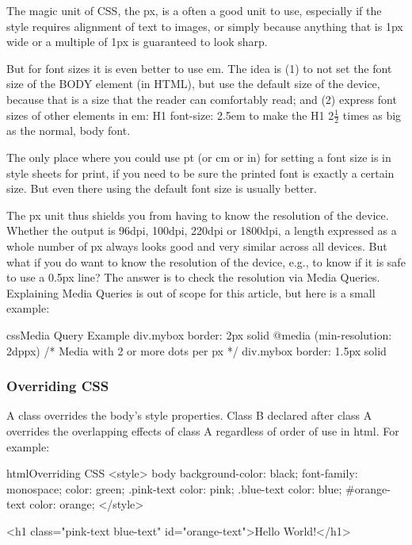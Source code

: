 The magic unit of CSS, the px, is a often a good unit to use, especially if the style requires alignment of text to images, or simply because anything that is 1px wide or a multiple of 1px is guaranteed to look sharp.

But for font sizes it is even better to use em. The idea is (1) to not set the font size of the BODY element (in HTML), but use the default size of the device, because that is a size that the reader can comfortably read; and (2) express font sizes of other elements in em: H1 {font-size: 2.5em} to make the H1 2$\frac{1}{2}$ times as big as the normal, body font.

The only place where you could use pt (or cm or in) for setting a font size is in style sheets for print, if you need to be sure the printed font is exactly a certain size. But even there using the default font size is usually better.

\begin{tcolorbox}

The px unit thus shields you from having to know the resolution of the device. Whether the output is 96dpi, 100dpi, 220dpi or 1800dpi, a length expressed as a whole number of px always looks good and very similar across all devices. But what if you do want to know the resolution of the device, e.g., to know if it is safe to use a 0.5px line? The answer is to check the resolution via Media Queries. Explaining Media Queries is out of scope for this article, but here is a small example:
\end{tcolorbox}

\begin{codeBlock}{css}{Media Query Example}
div.mybox { border: 2px solid }
@media (min-resolution: 2dppx) {
  /* Media with 2 or more dots per px */
  div.mybox { border: 1.5px solid }
}
\end{codeBlock}

\subsubsection{Overriding CSS}
A class overrides the body's style properties. Class B declared after class A overrides the overlapping effects of class A regardless of order of use in html. For example:

\begin{codeBlock}{html}{Overriding CSS}
<style>
  body {
    background-color: black;
    font-family: monospace;
    color: green;
  }
  .pink-text {
    color: pink;
  }
  .blue-text {
    color: blue;
  }
  #orange-text {
    color: orange;
  }
</style>

<h1 class="pink-text blue-text" id="orange-text">Hello World!</h1>
\end{codeBlock}

